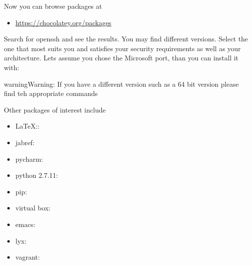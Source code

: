 Now you can browse packages at
\begin{itemize}
\item {} 
\url{https://chocolatey.org/packages}

\end{itemize}

Search for openssh and see the results. You may find different
versions. Select the one that most suits you and satisfies your
security requirements as well as your architecture. Lets assume you
chose the Microsoft port, than you can install it with:

\begin{sphinxVerbatim}[commandchars=\\\{\}]
  
\end{sphinxVerbatim}

\begin{sphinxadmonition}{warning}{Warning:}
If you have a different version such as a 64 bit version
please find teh appropriate commands
\end{sphinxadmonition}

Other packages of interest include
\begin{itemize}
\item {} 
LaTeX:: 

\item {} 
jabref: 

\item {} 
pycharm: 

\item {} 
python 2.7.11: 

\item {} 
pip: 

\item {} 
virtual box: 

\item {} 
emacs: 

\item {} 
lyx: 

\item {} 
vagrant: 

\end{itemize}

